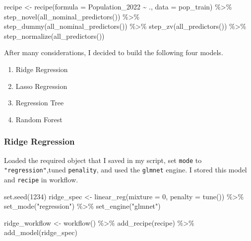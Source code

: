 \documentclass[
]{article}
\newenvironment{Shaded}{\begin{snugshade}}{\end{snugshade}}
\newcommand{\AttributeTok}[1]{\textcolor[rgb]{0.77,0.63,0.00}{#1}}
\newcommand{\DecValTok}[1]{\textcolor[rgb]{0.00,0.00,0.81}{#1}}
\newcommand{\FunctionTok}[1]{\textcolor[rgb]{0.00,0.00,0.00}{#1}}
\newcommand{\NormalTok}[1]{#1}
\newcommand{\OtherTok}[1]{\textcolor[rgb]{0.56,0.35,0.01}{#1}}
\newcommand{\SpecialCharTok}[1]{\textcolor[rgb]{0.00,0.00,0.00}{#1}}
\newcommand{\StringTok}[1]{\textcolor[rgb]{0.31,0.60,0.02}{#1}}
\begin{document}
\begin{Shaded}
\begin{Highlighting}[]
\NormalTok{recipe }\OtherTok{\textless{}{-}} 
  \FunctionTok{recipe}\NormalTok{(}\AttributeTok{formula =}\NormalTok{ Population\_2022 }\SpecialCharTok{\textasciitilde{}}\NormalTok{ ., }\AttributeTok{data =}\NormalTok{ pop\_train) }\SpecialCharTok{\%\textgreater{}\%} 
  \FunctionTok{step\_novel}\NormalTok{(}\FunctionTok{all\_nominal\_predictors}\NormalTok{()) }\SpecialCharTok{\%\textgreater{}\%} 
  \FunctionTok{step\_dummy}\NormalTok{(}\FunctionTok{all\_nominal\_predictors}\NormalTok{()) }\SpecialCharTok{\%\textgreater{}\%} 
  \FunctionTok{step\_zv}\NormalTok{(}\FunctionTok{all\_predictors}\NormalTok{()) }\SpecialCharTok{\%\textgreater{}\%} 
  \FunctionTok{step\_normalize}\NormalTok{(}\FunctionTok{all\_predictors}\NormalTok{())}
\end{Highlighting}
\end{Shaded}

After many considerations, I decided to build the following four models.

\begin{enumerate}
\def\labelenumi{\arabic{enumi}.}
\item
  Ridge Regression
\item
  Lasso Regression
\item
  Regression Tree
\item
  Random Forest
\end{enumerate}

\hypertarget{ridge-regression}{%
\subsubsection{Ridge Regression}\label{ridge-regression}}

Loaded the required object that I saved in my script, set \texttt{mode}
to \texttt{"regression"},tuned \texttt{penality}, and used the
\texttt{glmnet} engine. I stored this model and \texttt{recipe} in
workflow.

\begin{Shaded}
\begin{Highlighting}[]
\FunctionTok{set.seed}\NormalTok{(}\DecValTok{1234}\NormalTok{)}
\NormalTok{ridge\_spec }\OtherTok{\textless{}{-}} \FunctionTok{linear\_reg}\NormalTok{(}\AttributeTok{mixture =} \DecValTok{0}\NormalTok{, }\AttributeTok{penalty =} \FunctionTok{tune}\NormalTok{()) }\SpecialCharTok{\%\textgreater{}\%}
  \FunctionTok{set\_mode}\NormalTok{(}\StringTok{"regression"}\NormalTok{) }\SpecialCharTok{\%\textgreater{}\%}
  \FunctionTok{set\_engine}\NormalTok{(}\StringTok{"glmnet"}\NormalTok{)}

\NormalTok{ridge\_workflow }\OtherTok{\textless{}{-}} \FunctionTok{workflow}\NormalTok{() }\SpecialCharTok{\%\textgreater{}\%} 
  \FunctionTok{add\_recipe}\NormalTok{(recipe) }\SpecialCharTok{\%\textgreater{}\%} 
  \FunctionTok{add\_model}\NormalTok{(ridge\_spec)}
\end{Highlighting}
\end{Shaded}
\end{document}
